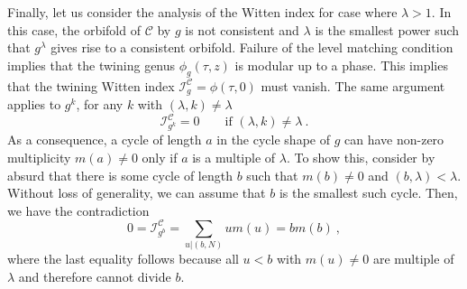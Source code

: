 \documentclass[a4paper,11pt]{article}
\newcommand{\C}{\mathcal{C}}
\newcommand{\I}{\mathcal{I}}
\numberwithin{equation}{section}
\def\be{\begin{equation}}
\def\ee{\end{equation}}
\begin{document}
Finally, let us consider the analysis of the Witten index for case where $\lambda> 1$. In this case, the orbifold of $\C$ by $g$ is not consistent and $\lambda$ is the smallest power such that $g^\lambda$ gives rise to a consistent orbifold. Failure of the level matching condition implies that the twining genus $\phi_g(\tau,z)$ is modular up to a phase. This implies that the twining Witten index $\I^\C_g=\phi(\tau,0)$ must vanish. The same argument applies to $g^k$, for any $k$ with $(\lambda,k)\neq \lambda$
\be\label{Ikvanish} \I^\C_{g^k}=0\qquad \text{if }(\lambda, k)\neq \lambda\ .
\ee As a consequence, a cycle of length $a$ in the cycle shape of $g$ can have non-zero multiplicity  $m(a)\neq 0$ only if $a$ is a multiple of $\lambda$. To show this, consider by absurd that there is some cycle of length $b$ such that $m(b)\neq 0$ and $(b,\lambda)<\lambda$. Without loss of generality, we can assume that $b$ is the smallest such cycle. Then, we have the contradiction
\be  0=\I^\C_{g^b}=\sum_{u|(b,N)} u m(u)=bm(b)\ ,
\ee where the last equality follows because all $u<b$ with $m(u)\neq 0$ are multiple of $\lambda$ and therefore cannot divide $b$. 
\end{document}

